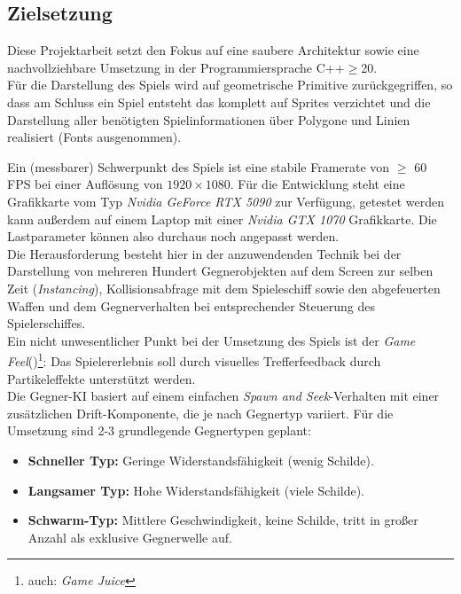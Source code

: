 \subsection{Zielsetzung}

Diese Projektarbeit setzt den Fokus auf eine saubere Architektur sowie eine nachvollziehbare Umsetzung in der Programmiersprache C++$\ge$20.\\
Für die Darstellung des Spiels wird auf geometrische Primitive zurückgegriffen, so dass am Schluss ein Spiel entsteht das komplett auf Sprites verzichtet und die Darstellung aller benötigten Spielinformationen über Polygone und Linien realisiert (Fonts ausgenommen).

\noindent
Ein (messbarer) Schwerpunkt des Spiels ist eine stabile Framerate von $\ge$ 60 FPS bei einer Auflösung von $1920 \times 1080$.
Für die Entwicklung steht eine Grafikkarte vom Typ \textit{Nvidia GeForce RTX 5090} zur Verfügung, getestet werden kann außerdem auf einem Laptop mit einer \textit{Nvidia GTX 1070} Grafikkarte.
Die Lastparameter können also durchaus noch angepasst werden.\\
Die Herausforderung besteht hier in der anzuwendenden Technik bei der Darstellung von mehreren Hundert Gegnerobjekten auf dem Screen zur selben Zeit (\textit{Instancing}), Kollisionsabfrage mit dem Spieleschiff sowie den abgefeuerten Waffen und dem Gegnerverhalten bei entsprechender Steuerung des Spielerschiffes.\\
Ein nicht unwesentlicher Punkt bei der Umsetzung des Spiels ist der \textit{Game Feel}(\cite{Swi08})\footnote{
auch: \textit{Game Juice}
}: Das Spielererlebnis soll durch visuelles Trefferfeedback durch Partikeleffekte unterstützt werden.\\

\noindent
Die Gegner-KI basiert auf einem einfachen \textit{Spawn and Seek}-Verhalten mit einer zusätzlichen Drift-Komponente, die je nach Gegnertyp variiert. Für die Umsetzung sind 2-3 grundlegende Gegnertypen geplant:
\begin{itemize}
\itemsep0.5em
\item \textbf{Schneller Typ:} Geringe Widerstandsfähigkeit (wenig Schilde).
\item \textbf{Langsamer Typ:} Hohe Widerstandsfähigkeit (viele Schilde).
\item \textbf{Schwarm-Typ:} Mittlere Geschwindigkeit, keine Schilde, tritt in großer Anzahl als exklusive Gegnerwelle auf.
\end{itemize}

